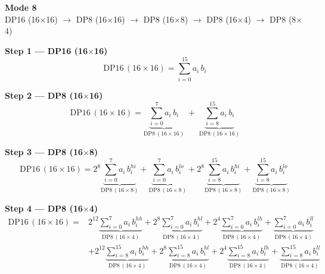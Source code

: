 \documentclass[fleqn]{article}
\newcommand{\DPop}[3]{\mathrm{DP#1}\,(#2\!\times\!#3)}
\begin{document}
\begin{center}
{\LARGE \textbf{Mode 8}}\\[4pt]
{\large DP16 (16$\times$16) $\rightarrow$ DP8 (16$\times$16) $\rightarrow$ DP8 (16$\times$8) $\rightarrow$ DP8 (16$\times$4) $\rightarrow$ DP8 (8$\times$4)}
\end{center}

\vspace{4em}

\noindent\textbf{Step 1 --- DP16 (16$\times$16)}
\[
\DPop{16}{16}{16} = \sum_{i=0}^{15} a_i \, b_i
\]

\vspace{0.5em}

\noindent\textbf{Step 2 --- DP8 (16$\times$16)}
\[
\DPop{16}{16}{16}
  = \underbrace{\sum_{i=0}^{7} a_i \, b_i}_{\DPop{8}{16}{16}}
  \; + \; \underbrace{\sum_{i=8}^{15} a_i \, b_i}_{\DPop{8}{16}{16}}
\]

\vspace{0.5em}

\noindent\textbf{Step 3 --- DP8 (16$\times$8)}
\[
\DPop{16}{16}{16}
  = 2^{8} \underbrace{\sum_{i=0}^{7} a_i \, b_i^{hi}}_{\DPop{8}{16}{8}}
  + \underbrace{\sum_{i=0}^{7} a_i \, b_i^{lo}}_{\DPop{8}{16}{8}}
  + 2^{8} \underbrace{\sum_{i=8}^{15} a_i \, b_i^{hi}}_{\DPop{8}{16}{8}}
  + \underbrace{\sum_{i=8}^{15} a_i \, b_i^{lo}}_{\DPop{8}{16}{8}}
\]

\vspace{0.5em}

\noindent\textbf{Step 4 --- DP8 (16$\times$4)}
\begin{align*}
\DPop{16}{16}{16} = {}
  & 2^{12} \underbrace{\sum_{i=0}^{7} a_i \, b_i^{hh}}_{\DPop{8}{16}{4}}
  + 2^{8} \underbrace{\sum_{i=0}^{7} a_i \, b_i^{hl}}_{\DPop{8}{16}{4}}
  + 2^{4} \underbrace{\sum_{i=0}^{7} a_i \, b_i^{lh}}_{\DPop{8}{16}{4}}
  + \underbrace{\sum_{i=0}^{7} a_i \, b_i^{ll}}_{\DPop{8}{16}{4}} \\[1em]
  & + 2^{12} \underbrace{\sum_{i=8}^{15} a_i \, b_i^{hh}}_{\DPop{8}{16}{4}}
  + 2^{8} \underbrace{\sum_{i=8}^{15} a_i \, b_i^{hl}}_{\DPop{8}{16}{4}}
  + 2^{4} \underbrace{\sum_{i=8}^{15} a_i \, b_i^{lh}}_{\DPop{8}{16}{4}}
  + \underbrace{\sum_{i=8}^{15} a_i \, b_i^{ll}}_{\DPop{8}{16}{4}}
\end{align*}

\vspace{0.5em}
\end{document}
